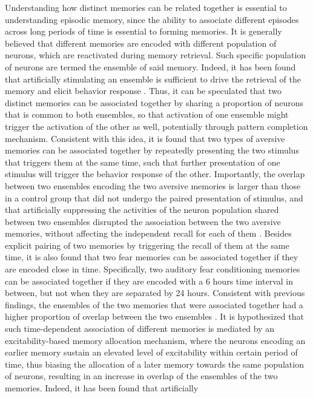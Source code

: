 \documentclass[master.tex]{subfiles}
\begin{document}
Understanding how distinct memories can be related together is essential to
understanding episodic memory, since the ability to associate different episodes
across long periods of time is essential to forming memories. It is generally
believed that different memories are encoded with different population of
neurons, which are reactivated during memory retrieval. Such specific population
of neurons are termed the ensemble of said memory. Indeed, it has been found
that artificially stimulating an ensemble is sufficient to drive the retrieval
of the memory and elicit behavior response \cite{ramirez_creating_2013}. Thus,
it can be speculated that two distinct memories can be associated together by
sharing a proportion of neurons that is common to both ensembles, so that
activation of one ensemble might trigger the activation of the other as well,
potentially through pattern completion mechanism. Consistent with this idea, it
is found that two types of aversive memories can be associated together by
repeatedly presenting the two stimulus that triggers them at the same time, such
that further presentation of one stimulus will trigger the behavior response of
the other. Importantly, the overlap between two ensembles encoding the two
aversive memories is larger than those in a control group that did not undergo
the paired presentation of stimulus, and that artificially suppressing the
activities of the neuron population shared between two ensembles disrupted the
association between the two aversive memories, without affecting the independent
recall for each of them \cite{yokose_overlapping_2017}. Besides explicit pairing
of two memories by triggering the recall of them at the same time, it is also
found that two fear memories can be associated together if they are encoded
close in time. Specifically, two auditory fear conditioning memories can be
associated together if they are encoded with a 6 hours time interval in between,
but not when they are separated by 24 hours. Consistent with previous findings,
the ensembles of the two memories that were associated together had a higher
proportion of overlap between the two ensembles \cite{rashid_competition_2016}.
It is hypothesized that such time-dependent association of different memories is
mediated by an excitability-based memory allocation mechanism, where the neurons
encoding an earlier memory sustain an elevated level of excitability within
certain period of time, thus biasing the allocation of a later memory towards
the same population of neurons, resulting in an increase in overlap of the
ensembles of the two memories. Indeed, it has been found that artificially
\end{document}
